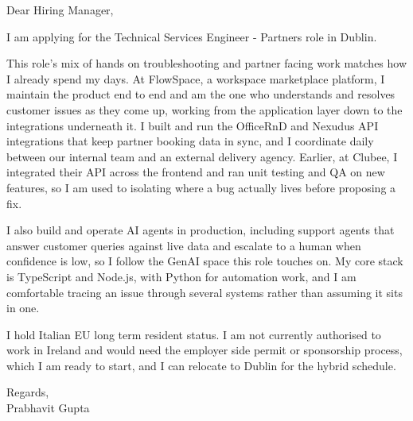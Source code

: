\documentclass[a4paper,11pt]{article}
\begin{document}
Dear Hiring Manager,

I am applying for the Technical Services Engineer - Partners role in Dublin.

This role's mix of hands on troubleshooting and partner facing work matches how I already spend my days. At FlowSpace, a workspace marketplace platform, I maintain the product end to end and am the one who understands and resolves customer issues as they come up, working from the application layer down to the integrations underneath it. I built and run the OfficeRnD and Nexudus API integrations that keep partner booking data in sync, and I coordinate daily between our internal team and an external delivery agency. Earlier, at Clubee, I integrated their API across the frontend and ran unit testing and QA on new features, so I am used to isolating where a bug actually lives before proposing a fix.

I also build and operate AI agents in production, including support agents that answer customer queries against live data and escalate to a human when confidence is low, so I follow the GenAI space this role touches on. My core stack is TypeScript and Node.js, with Python for automation work, and I am comfortable tracing an issue through several systems rather than assuming it sits in one.

I hold Italian EU long term resident status. I am not currently authorised to work in Ireland and would need the employer side permit or sponsorship process, which I am ready to start, and I can relocate to Dublin for the hybrid schedule.

Regards,\\
Prabhavit Gupta
\end{document}

